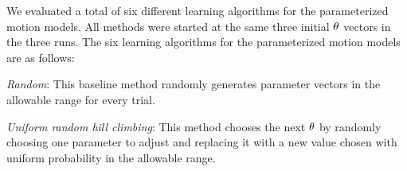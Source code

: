 We evaluated a total of six different learning algorithms for the
parameterized motion models.  All methods were started at the same
three initial ${\theta}$ vectors in the three runs.
The six learning algorithms for the parameterized motion models are as follows:









\emph{Random}: This baseline method randomly generates parameter vectors in the
allowable range for every trial.

\emph{Uniform random hill climbing}: This method chooses the next ${\theta}$ by
  randomly choosing one parameter to adjust and replacing it with a
  new value chosen with uniform probability in the allowable range.

